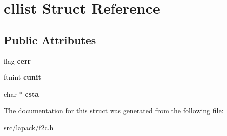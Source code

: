 \hypertarget{structcllist}{\section{cllist \-Struct \-Reference}
\label{structcllist}
}
\subsection*{\-Public \-Attributes}
\begin{DoxyCompactItemize}
\item 
\hypertarget{structcllist_afce750ad0c1a89568d816ee4c2c40333}{flag {\bfseries cerr}}\label{structcllist_afce750ad0c1a89568d816ee4c2c40333}

\item 
\hypertarget{structcllist_a5ecb27d52d6d1cdccf23f00e6586e4ff}{ftnint {\bfseries cunit}}\label{structcllist_a5ecb27d52d6d1cdccf23f00e6586e4ff}

\item 
\hypertarget{structcllist_a8f52d307fd020ad43a2f2e9a2d665103}{char $\ast$ {\bfseries csta}}\label{structcllist_a8f52d307fd020ad43a2f2e9a2d665103}

\end{DoxyCompactItemize}


\-The documentation for this struct was generated from the following file\-:\begin{DoxyCompactItemize}
\item 
src/lapack/f2c.\-h\end{DoxyCompactItemize}
